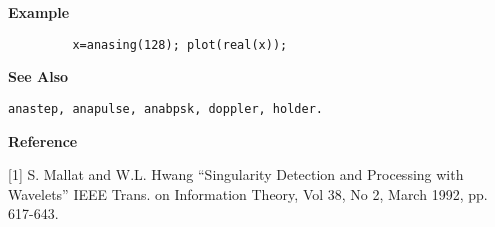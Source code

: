 {\bf \large \sf Example}
\begin{verbatim}
         x=anasing(128); plot(real(x));
\end{verbatim}
\vspace*{.5cm}


{\bf \large \sf See Also}\\
\hspace*{1.5cm}
\begin{minipage}[t]{13.5cm}
\begin{verbatim}
anastep, anapulse, anabpsk, doppler, holder.
\end{verbatim}
\end{minipage}
\vspace*{.5cm}


{\bf \large \sf Reference}\\
\hspace*{1.5cm}
\begin{minipage}[t]{13.5cm}
[1] S. Mallat and W.L. Hwang ``Singularity Detection and Processing with
Wavelets'' IEEE Trans. on Information Theory, Vol 38, No 2, March 1992,
pp. 617-643.
\end{minipage}

